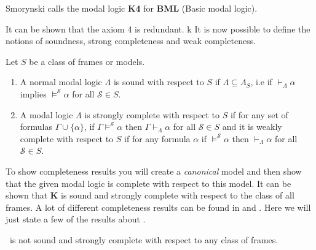 \documentclass[../main.tex]{subfiles}
\begin{document}
\begin{remark}
	Smorynski calls the modal logic \textbf{K4} for \textbf{BML} (Basic modal
logic).
\end{remark}


It can be shown that the axiom 4 is redundant. k
It is now possible to define the notions of soundness, strong completeness and
weak completeness.
\begin{defi}
	Let $S$ be a class of frames or models.
	\begin{enumerate}
		\item A normal modal logic $\Lambda$ is sound with respect to $S$ if
		$\Lambda\subseteq\Lambda_S$, i.e if $\vdash_\Lambda\alpha$
		implies $\vDash^\mathcal{S}\alpha$ for all $\mathcal{S}\in S$.
	\item A modal logic $\Lambda$ is strongly complete with respect to $S$
		if for any set of formulas $\Gamma\cup\{\alpha\}$, if
		$\Gamma\vDash^\mathcal{S}\alpha$ then
		$\Gamma\vdash_\Lambda\alpha$ for all $\mathcal{S}\in S$ and it
		is weakly complete with respect to $S$ if for any formula
		$\alpha$ if $\vDash^\mathcal{S}\alpha$ then
		$\vdash_\Lambda\alpha$ for all $\mathcal{S}\in S$.
	\end{enumerate}
\end{defi}
To show completeness results you will create a \textit{canonical} model and
then show that the given modal logic is complete with respect to this model. It
can be shown that \textbf{K} is sound and strongly complete with respect to the
class of all frames. A lot of different completeness results can be found in
\cite{Lemmon1977} and \cite{Blackburn2002}. Here we will just state a few of
the results about \GL.

\begin{thm}
	\GL\ is not sound and strongly complete with respect to any class of
	frames.
\end{thm}
\end{document}
